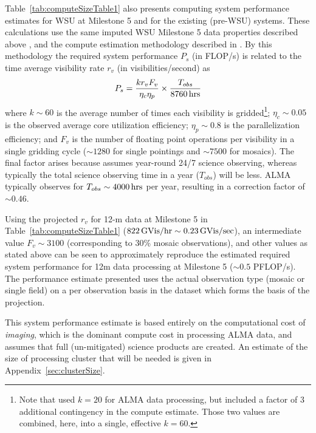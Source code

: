  Table~\ref{tab:computeSizeTable1} also presents computing system performance estimates for WSU at Milestone 5 and for the existing (pre-WSU) systems. These calculations use the same imputed WSU Milestone 5 data properties described above \cite{drru_mean}, and the compute estimation methodology described in \cite{dpSizeOfCompute}. By this methodology
 the required system performance $P_s$ (in FLOP/s) is related to the time average visibility rate $r_v$ (in visibilities/second) as
 \begin{equation}
  P_s = \frac{k r_v F_v}{\eta_c \eta_p} \times \frac{T_{obs}}{\rm 8760 \, hrs}    
 \end{equation}
 where $k \sim 60$ is the average number of times each visibility is gridded\footnote{Note that \cite{dpSizeOfCompute} used $k=20$ for ALMA data processing, but \cite{computeCostTsi} included a factor of $3$ additional contingency in the compute estimate. Those two values are combined, here, into a single, effective $k=60$.}; $\eta_c \sim 0.05$ is the observed average core utilization efficiency; $\eta_p \sim 0.8$ is the parallelization efficiency; and $F_v$ is the number of floating point operations per visibility in a single gridding cycle ($\sim 1280$ for single pointings and $\sim 7500$ for mosaics). 
 The final factor arises because \cite{dpSizeOfCompute} assumes year-round 24/7 science observing, whereas typically the total science observing time in a year ($T_{obs}$) will be less. ALMA typically observes for $T_{obs} \sim 4000 \, {\rm hrs}$ per year, resulting in a correction factor of $\sim 0.46$.
 
 Using the projected $r_v$ for 12-m data at Milestone 5 in Table~\ref{tab:computeSizeTable1} ($822 \, {\rm GVis/hr} \sim 0.23 \, {\rm GVis/sec}$), an intermediate value $F_v \sim 3100$ (corresponding to 30\% mosaic observations), and other values as stated above can be seen to approximately reproduce the estimated required system performance for 12m data processing at Milestone 5 ($\sim 0.5$ PFLOP/s). The performance estimate presented uses the actual observation type (mosaic or single field) on a per observation basis in the dataset which forms the basis of the projection.


This system  performance estimate is based entirely on the computational cost of {\it imaging}, which is the dominant compute cost in processing ALMA data, and assumes that full (un-mitigated) science products are created.  An estimate of the size of processing cluster that will be needed is given in Appendix~\ref{sec:clusterSize}.

